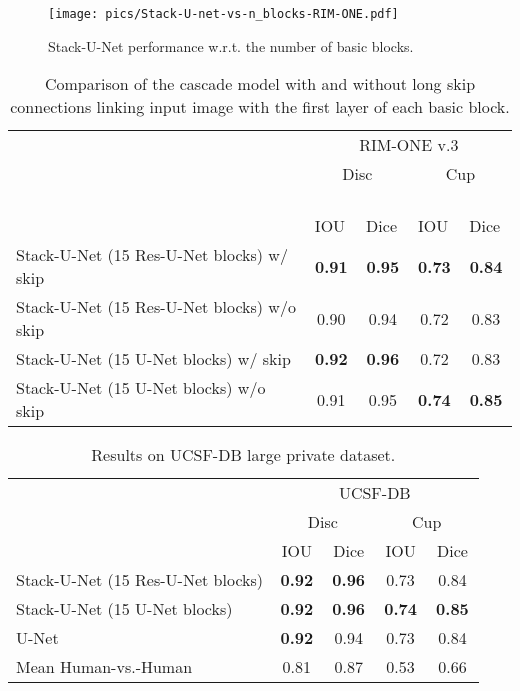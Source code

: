 \documentclass{llncs}
\begin{document}
      \begin{figure}[ht!]
        \centering
        \texttt{[image: pics/Stack-U-net-vs-n\_blocks-RIM-ONE.pdf]}
        \caption{Stack-U-Net performance w.r.t. the number of basic blocks.}
        \label{fig:stack-u-net_vs_n_blocks}
    \end{figure}
    
    \begin{table}[ht!]
        	\centering
        	\begin{tabular}{l|c|c|c|c}
        		\hline
        		&
        		\multicolumn{4}{c}{\,RIM-ONE v.3\,} \\   %
        		& \multicolumn{2}{c|}{\,Disc\,}  & \multicolumn{2}{c}{\,Cup\,}  \\ 
                & \,IOU\, & \,Dice\,  & \,IOU\, & \,Dice\, \\ \hline \hline
        		Stack-U-Net (15 Res-U-Net blocks) w/ skip & \textbf{0.91} & \textbf{0.95}& \textbf{0.73} & \textbf{0.84} \\
                Stack-U-Net (15 Res-U-Net blocks) w/o skip & 0.90 & 0.94 & 0.72 & 0.83 \\ \hline
                Stack-U-Net (15 U-Net blocks) w/ skip &\textbf{0.92} & \textbf{0.96} & 0.72 & 0.83 \\
                Stack-U-Net (15 U-Net blocks) w/o skip & 0.91 & 0.95 & \textbf{0.74} & \textbf{0.85} \\ \hline
        	\end{tabular}
            \newline\newline
        	\caption{Comparison of the cascade model with and without long skip connections linking input image with the first layer of each basic block.}
            \label{table:skip_connections}
\end{table}
        
\begin{table}[ht!]
            \centering
        	\begin{tabular}{l|c|c|c|c}
        		\hline
                & \multicolumn{4}{c}{\,UCSF-DB\,} \\   
                & \multicolumn{2}{c}{\,Disc\,}  & \multicolumn{2}{|c}{\,Cup\,}  \\ 
                & \,IOU\, & \,Dice\,  & \,IOU\, & \,Dice\, \\ \hline \hline 
                Stack-U-Net (15 Res-U-Net blocks) &  \textbf{0.92} & \textbf{0.96} & 0.73  & 0.84  \\
                Stack-U-Net (15 U-Net blocks) & \textbf{0.92} & \textbf{0.96} & \textbf{0.74}  & \textbf{0.85} \\
                U-Net &  \textbf{0.92} & 0.94  &  0.73  & 0.84 \\ 
                Mean Human-vs.-Human & 0.81 & 0.87 & 0.53 & 0.66 \\ \hline
            \end{tabular}
            \newline\newline
            \caption{Results on UCSF-DB large private dataset.}
            \label{table:ucsf_results}
\end{table}
\end{document}
